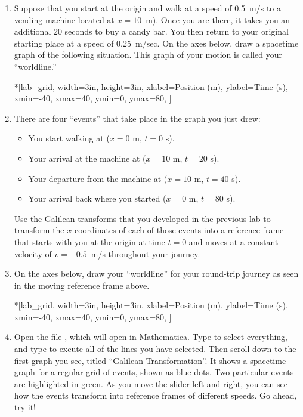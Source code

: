 \begin{enumerate}[labparts]

\item Suppose that you start at the origin and walk at a speed of 0.5~m/s to a vending machine located at $x=10$~m).  Once you are there, it takes you an additional 20 seconds to buy a candy bar.  You then return to your original starting place at a speed of 0.25~m/sec. On the axes below, draw a spacetime graph of the following situation.  This graph of your motion is called your ``worldline.''

\begin{lab_axis}*[lab_grid,
	width=3in, height=3in,
	xlabel={Position (m)},
	ylabel={Time (s)},
	xmin=-40, xmax=40,
	ymin=0, ymax=80,
	]
\end{lab_axis}

\pagebreak[2]
\item There are four ``events'' that take place in the graph you just drew:
\begin{itemize}[nosep]
\item You start walking at ($x=0$ m, $t=0$ s).
\item Your arrival at the machine at ($x=10$ m, $t=20$ s).
\item Your departure from the machine at ($x=10$ m, $t=40$ s).
\item Your arrival back where you started ($x=0$ m, $t=80$ s).
\end{itemize}
Use the Galilean transforms that you developed in the previous lab to transform the $x$ coordinates of each of those events into a reference frame that starts with you at the origin at time $t=0$ and moves at a constant velocity of $v=+0.5$~m/s throughout your journey.
\answerspace{1in}

\item On the axes below, draw your ``worldline'' for your round-trip journey as seen in the moving reference frame above.

\begin{lab_axis}*[lab_grid,
	width=3in, height=3in,
	xlabel={Position (m)},
	ylabel={Time (s)},
	xmin=-40, xmax=40,
	ymin=0, ymax=80,
	]
\end{lab_axis}

\item Open the file , which will open in Mathematica.  Type  to select everything, and type  to excute all of the lines you have selected.  Then scroll down to the first graph you see, titled ``Galilean Transformation''.    It shows a spacetime graph for a regular grid of events, shown as blue dots.  Two particular events are highlighted in green.  As you move the slider left and right, you can see how the events transform into reference frames of different speeds.  Go ahead, try it!


\end{enumerate}
